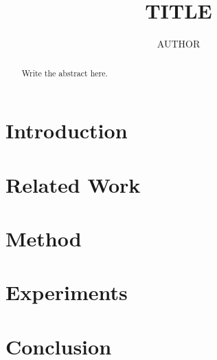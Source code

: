 \documentclass[journal]{IEEEtran}
\title{{{TITLE}}}
\author{{{AUTHOR}}}
\begin{document}
\maketitle

\begin{abstract}
Write the abstract here.
\end{abstract}

\section{Introduction}

\section{Related Work}

\section{Method}

\section{Experiments}

\section{Conclusion}



\end{document}
